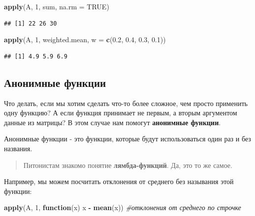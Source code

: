 \documentclass[]{book}
\newenvironment{Shaded}{\begin{snugshade}}{\end{snugshade}}
\newcommand{\KeywordTok}[1]{\textcolor[rgb]{0.13,0.29,0.53}{\textbf{#1}}}
\newcommand{\DataTypeTok}[1]{\textcolor[rgb]{0.13,0.29,0.53}{#1}}
\newcommand{\DecValTok}[1]{\textcolor[rgb]{0.00,0.00,0.81}{#1}}
\newcommand{\FloatTok}[1]{\textcolor[rgb]{0.00,0.00,0.81}{#1}}
\newcommand{\StringTok}[1]{\textcolor[rgb]{0.31,0.60,0.02}{#1}}
\newcommand{\CommentTok}[1]{\textcolor[rgb]{0.56,0.35,0.01}{\textit{#1}}}
\newcommand{\OtherTok}[1]{\textcolor[rgb]{0.56,0.35,0.01}{#1}}
\newcommand{\ControlFlowTok}[1]{\textcolor[rgb]{0.13,0.29,0.53}{\textbf{#1}}}
\newcommand{\OperatorTok}[1]{\textcolor[rgb]{0.81,0.36,0.00}{\textbf{#1}}}
\newcommand{\NormalTok}[1]{#1}
\begin{document}
\begin{Shaded}
\begin{Highlighting}[]
\KeywordTok{apply}\NormalTok{(A, }\DecValTok{1}\NormalTok{, sum, }\DataTypeTok{na.rm =} \OtherTok{TRUE}\NormalTok{)}
\end{Highlighting}
\end{Shaded}

\begin{verbatim}
## [1] 22 26 30
\end{verbatim}

\begin{Shaded}
\begin{Highlighting}[]
\KeywordTok{apply}\NormalTok{(A, }\DecValTok{1}\NormalTok{, weighted.mean, }\DataTypeTok{w =} \KeywordTok{c}\NormalTok{(}\FloatTok{0.2}\NormalTok{, }\FloatTok{0.4}\NormalTok{, }\FloatTok{0.3}\NormalTok{, }\FloatTok{0.1}\NormalTok{)) }
\end{Highlighting}
\end{Shaded}

\begin{verbatim}
## [1] 4.9 5.9 6.9
\end{verbatim}

\subsection{Анонимные функции}\label{anon_f}

Что делать, если мы хотим сделать что-то более сложное, чем просто
применить одну функцию? А если функция принимает не первым, а вторым
аргументом данные из матрицы? В этом случае нам помогут
\textbf{анонимные функции}.

Анонимные функции - это функции, которые будут использоваться один раз и
без названия.

\begin{quote}
Питонистам знакомо понятие \textbf{лямбда-функций}. Да, это то же самое.
\end{quote}

Например, мы можем посчитать отклонения от среднего без называния этой
функции:

\begin{Shaded}
\begin{Highlighting}[]
\KeywordTok{apply}\NormalTok{(A, }\DecValTok{1}\NormalTok{, }\ControlFlowTok{function}\NormalTok{(x) x }\OperatorTok{-}\StringTok{ }\KeywordTok{mean}\NormalTok{(x)) }\CommentTok{#отклонения от среднего по строчке}
\end{Highlighting}
\end{Shaded}
\end{document}
